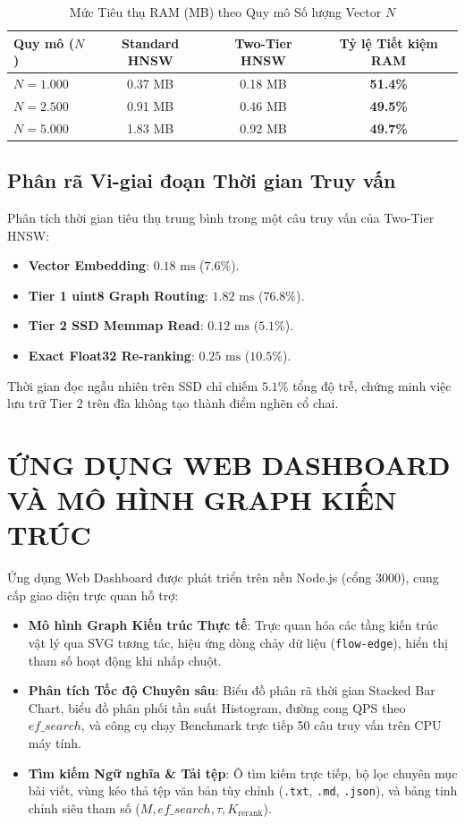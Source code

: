 \documentclass[12pt,a4paper]{article}
\begin{document}
\begin{table}[H]
\centering
\small
\caption{Mức Tiêu thụ RAM (MB) theo Quy mô Số lượng Vector $N$}
\begin{tabular}{lccc}
\toprule
\textbf{Quy mô ($N$)} & \textbf{Standard HNSW} & \textbf{Two-Tier HNSW} & \textbf{Tỷ lệ Tiết kiệm RAM} \\
\midrule
$N = 1.000$ & 0.37 MB & 0.18 MB & \textbf{51.4\%} \\
$N = 2.500$ & 0.91 MB & 0.46 MB & \textbf{49.5\%} \\
$N = 5.000$ & 1.83 MB & 0.92 MB & \textbf{49.7\%} \\
\bottomrule
\end{tabular}
\end{table}

\subsection{Phân rã Vi-giai đoạn Thời gian Truy vấn}
Phân tích thời gian tiêu thụ trung bình trong một câu truy vấn của Two-Tier HNSW:
\begin{itemize}
  \item \textbf{Vector Embedding}: $0.18\text{ ms}$ ($7.6\%$).
  \item \textbf{Tier 1 uint8 Graph Routing}: $1.82\text{ ms}$ ($76.8\%$).
  \item \textbf{Tier 2 SSD Memmap Read}: $0.12\text{ ms}$ ($5.1\%$).
  \item \textbf{Exact Float32 Re-ranking}: $0.25\text{ ms}$ ($10.5\%$).
\end{itemize}
Thời gian đọc ngẫu nhiên trên SSD chỉ chiếm $5.1\%$ tổng độ trễ, chứng minh việc lưu trữ Tier 2 trên đĩa không tạo thành điểm nghẽn cổ chai.

\section{ỨNG DỤNG WEB DASHBOARD VÀ MÔ HÌNH GRAPH KIẾN TRÚC}
Ứng dụng Web Dashboard được phát triển trên nền Node.js (cổng 3000), cung cấp giao diện trực quan hỗ trợ:
\begin{itemize}
  \item \textbf{Mô hình Graph Kiến trúc Thực tế}: Trực quan hóa các tầng kiến trúc vật lý qua SVG tương tác, hiệu ứng dòng chảy dữ liệu (\texttt{flow-edge}), hiển thị tham số hoạt động khi nhấp chuột.
  \item \textbf{Phân tích Tốc độ Chuyên sâu}: Biểu đồ phân rã thời gian Stacked Bar Chart, biểu đồ phân phối tần suất Histogram, đường cong QPS theo $ef\_search$, và công cụ chạy Benchmark trực tiếp 50 câu truy vấn trên CPU máy tính.
  \item \textbf{Tìm kiếm Ngữ nghĩa \& Tải tệp}: Ô tìm kiếm trực tiếp, bộ lọc chuyên mục bài viết, vùng kéo thả tệp văn bản tùy chỉnh (\texttt{.txt}, \texttt{.md}, \texttt{.json}), và bảng tinh chỉnh siêu tham số ($M, ef\_search, \tau, K_{\text{rerank}}$).
\end{itemize}
\end{document}
